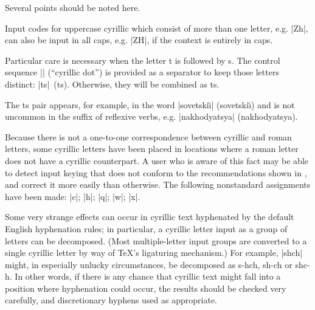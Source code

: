 \topinsert
\begingroup

\endgroup
\endinsert

\indent
Several points should be noted here.

\nobreak
\item{\bull} Input codes for uppercase cyrillic which consist of more than
  one letter, e.g. |Zh|, can also be input in all caps, e.g. |ZH|,
  if the context is entirely in caps.

\item{\bull} Particular care is necessary when the letter t is followed
  by s.  The control sequence |\cydot| (``cyrillic dot'')
  is provided as a separator to keep those letters distinct:
  |t\cydot s|~(t\cydot s).
  Otherwise, they will be combined as ts.

\item{} The t\cydot s pair appears, for example, in the word
  |sovet\cydot ski\u\i|
  (sovet\cydot ski\u\i)
  and is not uncommon in the suffix of reflexive verbs, e.g.
  \hbox{|nakhodyat\cydot sya|}
  (nakhodyat\cydot sya).

\item{\bull} Because there is not a one-to-one correspondence between
  cyrillic and roman letters, some cyrillic letters have been placed
  in locations where a roman letter does not have a cyrillic
  counterpart.  A user who is aware of this fact may be able to
  detect input keying that does not conform to the recommendations
  shown in \cyrtablefig, and correct it more easily than otherwise.
  The following nonstandard assignments have been made:\newline
\indent |c|; |h|; |q|; |w|; |x|.

\item{\bull} Some very strange effects can occur in cyrillic text
  hyphenated by the default English hyphenation rules; in particular,
  a cyrillic letter input as a group of letters can be decomposed.
  (Most multiple-letter input groups are converted to a single cyrillic
  letter by way of \TeX's ligaturing mechanism.)  For example,
  |shch| might, in especially unlucky circumstances, be
  decomposed as {\cyr s-hch}, {\cyr sh-ch} or {\cyr shc-h}.
  In other words, if there is any chance that cyrillic text might fall
  into a position where hyphenation could occur, the results should be
  checked very carefully, and discretionary hyphens used as appropriate.

